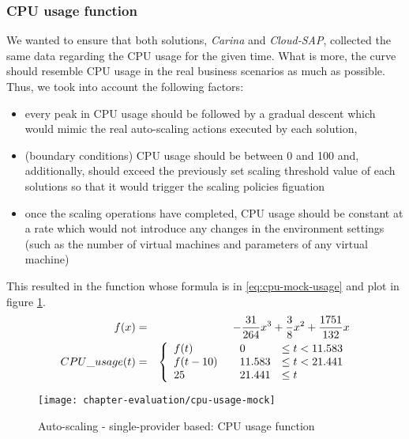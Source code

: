 \subsubsection*{CPU usage function}
We wanted to ensure that both solutions, \emph{Carina} and \emph{Cloud-SAP}, collected the same data regarding the CPU usage for the given time. What is more, the curve should resemble CPU usage in the real business scenarios as much as possible. Thus, we took into account the following factors:
\begin{itemize}
  \item every peak in CPU usage should be followed by a gradual descent which would mimic the real auto-scaling actions executed by each solution,
  \item (boundary conditions) CPU usage should be between 0 and 100 and, additionally, should exceed the previously set scaling threshold value of each solutions so that it would trigger the scaling policies figuation
  \item once the scaling operations have completed, CPU usage should be constant at a rate which would not introduce any changes in the environment settings (such as the number of virtual machines and parameters of any virtual machine)
\end{itemize}
This resulted in the function whose formula is in \eqref{eq:cpu-mock-usage} and plot in figure \ref{fig:auto-scaling-1cp-cpu-usage-function}.
\begin{eqnarray}
  f(x) &=& -\frac{31}{264}x^3+\frac{3}{8}x^2+\frac{1751}{132}x \nonumber \\
  CPU\_usage(t) &=& \left\{
  \begin{array}{l l l}
    f(t) & \quad 0 & \le t < 11.583 \\
    f(t-10) & \quad 11.583 & \le t < 21.441 \\
    25 & \quad 21.441 & \le  t \\
\end{array} \right.
\label{eq:cpu-mock-usage}
\end{eqnarray}

\begin{figure}[!ht]
  \begin{center}
    \texttt{[image: chapter-evaluation/cpu-usage-mock]}
  \end{center}
  \caption{Auto-scaling - single-provider based: CPU usage function}
  \label{fig:auto-scaling-1cp-cpu-usage-function}
\end{figure}

